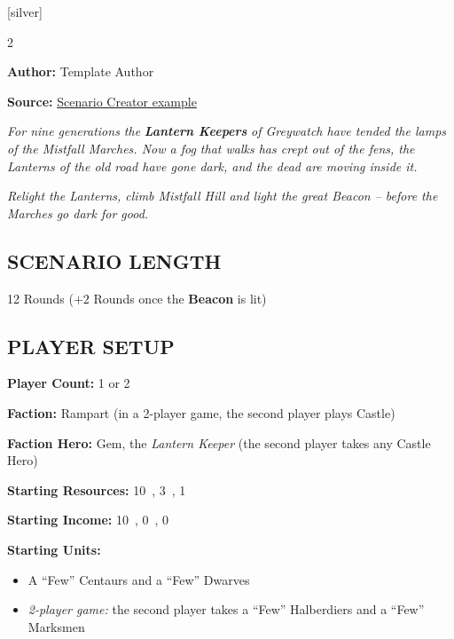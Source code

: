 \cleardoublepage{}
[silver]

\begin{multicols*}{2}

\textbf{Author:} Template Author

\textbf{Source:} \href{https://github.com/qwrtln/Homm3BG-mission-book}{Scenario Creator example}

\textit{For nine generations the }\textbf{\textit{Lantern Keepers}}\textit{ of Greywatch have tended the lamps of the Mistfall Marches. Now a fog that walks has crept out of the fens, the Lanterns of the old road have gone dark, and the dead are moving inside it.}

\textit{Relight the Lanterns, climb Mistfall Hill and light the great Beacon -- before the Marches go dark for good.}

\subsection*{\MakeUppercase{Scenario Length}}

12 Rounds ($+2$ Rounds once the \textbf{Beacon} is lit)

\subsection*{\MakeUppercase{Player Setup}}

\textbf{Player Count:} 1 or 2

\textbf{Faction:} Rampart (in a 2-player game, the second player plays Castle)

\textbf{Faction Hero:} Gem, the \textit{Lantern Keeper} (the second player takes any Castle Hero)

\textbf{Starting Resources:} 10~, 3~, 1~

\textbf{Starting Income:} 10~, 0~, 0~

\textbf{Starting Units:}
\begin{itemize}
  \item A ``Few'' Centaurs and a ``Few'' Dwarves
  \item \textit{2-player game:} the second player takes a ``Few'' Halberdiers and a ``Few'' Marksmen
\end{itemize}


\end{multicols*}
